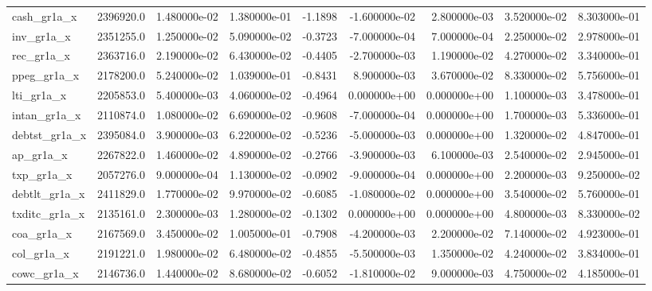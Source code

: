 \documentclass[12pt]{article}
\begin{document}
\begin{landscape}
\begin{longtable}{|l|r|r|r|r|r|r|r|r|}
cash\_gr1a\_x             &  2396920.0 &  1.480000e-02 &  1.380000e-01 &     -1.1898 & -1.600000e-02 &  2.800000e-03 &  3.520000e-02 &  8.303000e-01 \\
inv\_gr1a\_x              &  2351255.0 &  1.250000e-02 &  5.090000e-02 &     -0.3723 & -7.000000e-04 &  7.000000e-04 &  2.250000e-02 &  2.978000e-01 \\
rec\_gr1a\_x              &  2363716.0 &  2.190000e-02 &  6.430000e-02 &     -0.4405 & -2.700000e-03 &  1.190000e-02 &  4.270000e-02 &  3.340000e-01 \\
ppeg\_gr1a\_x             &  2178200.0 &  5.240000e-02 &  1.039000e-01 &     -0.8431 &  8.900000e-03 &  3.670000e-02 &  8.330000e-02 &  5.756000e-01 \\
lti\_gr1a\_x              &  2205853.0 &  5.400000e-03 &  4.060000e-02 &     -0.4964 &  0.000000e+00 &  0.000000e+00 &  1.100000e-03 &  3.478000e-01 \\
intan\_gr1a\_x            &  2110874.0 &  1.080000e-02 &  6.690000e-02 &     -0.9608 & -7.000000e-04 &  0.000000e+00 &  1.700000e-03 &  5.336000e-01 \\
debtst\_gr1a\_x           &  2395084.0 &  3.900000e-03 &  6.220000e-02 &     -0.5236 & -5.000000e-03 &  0.000000e+00 &  1.320000e-02 &  4.847000e-01 \\
ap\_gr1a\_x               &  2267822.0 &  1.460000e-02 &  4.890000e-02 &     -0.2766 & -3.900000e-03 &  6.100000e-03 &  2.540000e-02 &  2.945000e-01 \\
txp\_gr1a\_x              &  2057276.0 &  9.000000e-04 &  1.130000e-02 &     -0.0902 & -9.000000e-04 &  0.000000e+00 &  2.200000e-03 &  9.250000e-02 \\
debtlt\_gr1a\_x           &  2411829.0 &  1.770000e-02 &  9.970000e-02 &     -0.6085 & -1.080000e-02 &  0.000000e+00 &  3.540000e-02 &  5.760000e-01 \\
txditc\_gr1a\_x           &  2135161.0 &  2.300000e-03 &  1.280000e-02 &     -0.1302 &  0.000000e+00 &  0.000000e+00 &  4.800000e-03 &  8.330000e-02 \\
coa\_gr1a\_x              &  2167569.0 &  3.450000e-02 &  1.005000e-01 &     -0.7908 & -4.200000e-03 &  2.200000e-02 &  7.140000e-02 &  4.923000e-01 \\
col\_gr1a\_x              &  2191221.0 &  1.980000e-02 &  6.480000e-02 &     -0.4855 & -5.500000e-03 &  1.350000e-02 &  4.240000e-02 &  3.834000e-01 \\
cowc\_gr1a\_x             &  2146736.0 &  1.440000e-02 &  8.680000e-02 &     -0.6052 & -1.810000e-02 &  9.000000e-03 &  4.750000e-02 &  4.185000e-01 \\

\end{longtable}
\end{landscape}
\end{document}
